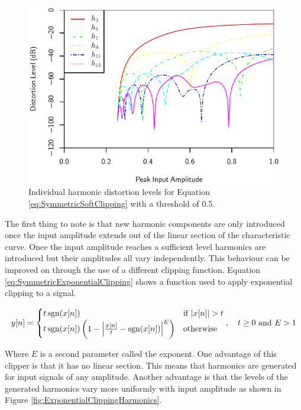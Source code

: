 			\begin{figure}[h!]
				\centering
				\includegraphics{chapter5/Images/SoftClippingHarmonics.pdf}
				\caption{Individual harmonic distortion levels for Equation \ref{eq:SymmetricSoftClipping}
					 with a threshold of 0.5.}
				\label{fig:SoftClippingHarmonics}
			\end{figure}

			The first thing to note is that new harmonic components are only introduced once the input amplitude
			extends out of the linear section of the characteristic curve. Once the input amplitude reaches a
			sufficient level harmonics are introduced but their amplitudes all vary independently. This
			behaviour can be improved on through the use of a different clipping function. Equation
			\ref{eq:SymmetricExponentialClipping} shows a function used to apply exponential clipping to a
			signal.
			
			\begin{equation}
				y[n] = \begin{cases}
					t\operatorname{sgn}(x[n]) & \text{if $\left|x[n]\right| > t$} \\
					t\operatorname{sgn}(x[n]) \left(1 - \left|\frac{x[n]}{t} - \operatorname{sgn}(x[n])\right|^{E} \right) &
						\text{otherwise}
				\end{cases}, \quad t \geq 0 \ \text{and} \ E > 1
				\label{eq:SymmetricExponentialClipping}
			\end{equation}

			Where $E$ is a second parameter called the exponent. One advantage of this clipper is that it has
			no linear section. This means that harmonics are generated for input signals of any amplitude.
			Another advantage is that the levels of the generated harmonics vary more uniformly with input
			amplitude as shown in Figure \ref{fig:ExponentialClippingHarmonics}.

